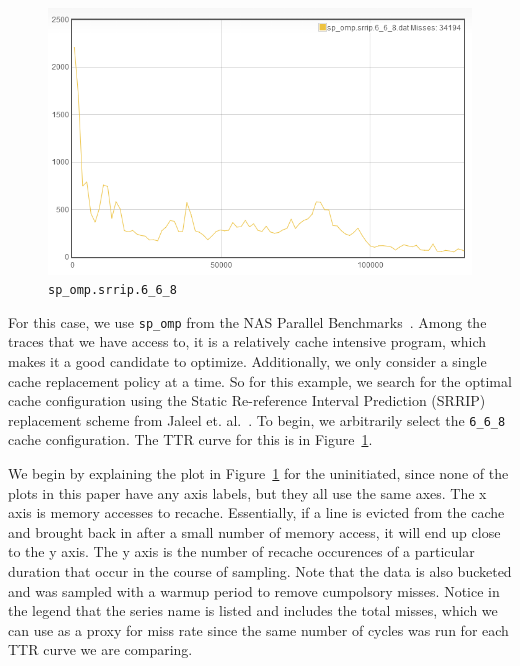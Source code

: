 \begin{figure}[ht]
\begin{center}
\includegraphics[width={0.9\columnwidth}]{images/sp_omp-srrip-6_6_8}
\end{center}
\caption{\texttt{sp\_omp.srrip.6\_6\_8}}
\label{6_6_8}
\end{figure}

For this case, we use \texttt{sp\_omp} from the NAS Parallel Benchmarks~\cite{bailey94}. Among the traces that we have access to, it is a relatively cache intensive program, which makes it a good candidate to optimize. Additionally, we only consider a single cache replacement policy at a time. So for this example, we search for the optimal cache configuration using the Static Re-reference Interval Prediction (SRRIP) replacement scheme from Jaleel et. al.~\cite{jaleeltheobald10}. To begin, we arbitrarily select the 
\texttt{6\_6\_8 } cache configuration. The TTR curve for this is in Figure~\ref{6_6_8}.

We begin by explaining the plot in Figure~\ref{6_6_8} for the uninitiated, since none of the plots in this paper have any axis labels, but they all use the same axes. The x axis is memory accesses to recache. Essentially, if a line is evicted from the cache and brought back in after a small number of memory access, it will end up close to the y axis. The y axis is the number of recache occurences of a particular duration that occur in the course of sampling. Note that the data is also bucketed and was sampled with a warmup period to remove cumpolsory misses. Notice in the legend that the series name is listed and includes the total misses, which we can use as a proxy for miss rate since the same number of cycles was run for each TTR curve we are comparing.

